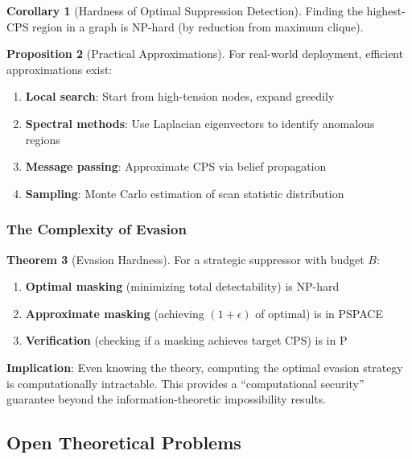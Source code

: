\documentclass[12pt,a4paper]{article}
\theoremstyle{definition}
\newtheorem{theorem}{Theorem}[section]
\newtheorem{corollary}[theorem]{Corollary}
\newtheorem{proposition}[theorem]{Proposition}
\theoremstyle{remark}
\begin{document}
\begin{corollary}[Hardness of Optimal Suppression Detection]
Finding the highest-CPS region in a graph is NP-hard (by reduction from maximum clique).
\end{corollary}

\begin{proposition}[Practical Approximations]
For real-world deployment, efficient approximations exist:
\begin{enumerate}
    \item \textbf{Local search}: Start from high-tension nodes, expand greedily
    \item \textbf{Spectral methods}: Use Laplacian eigenvectors to identify anomalous regions
    \item \textbf{Message passing}: Approximate CPS via belief propagation
    \item \textbf{Sampling}: Monte Carlo estimation of scan statistic distribution
\end{enumerate}
\end{proposition}

\subsubsection{The Complexity of Evasion}

\begin{theorem}[Evasion Hardness]
\label{thm:evasion-hard}
For a strategic suppressor with budget $B$:
\begin{enumerate}
    \item \textbf{Optimal masking} (minimizing total detectability) is NP-hard
    \item \textbf{Approximate masking} (achieving $(1+\epsilon)$ of optimal) is in PSPACE
    \item \textbf{Verification} (checking if a masking achieves target CPS) is in P
\end{enumerate}
\end{theorem}

\textbf{Implication}: Even knowing the theory, computing the optimal evasion strategy is computationally intractable. This provides a ``computational security'' guarantee beyond the information-theoretic impossibility results.

\subsection{Open Theoretical Problems}
\end{document}
